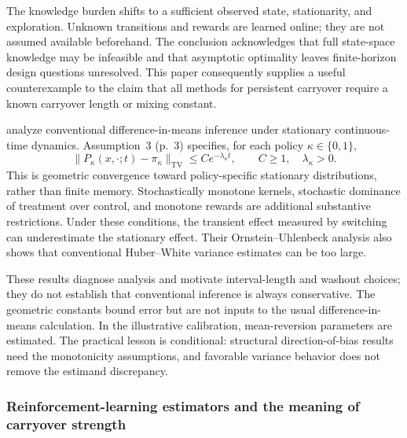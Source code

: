 The knowledge burden shifts to a sufficient observed state, stationarity, and exploration. Unknown transitions and rewards are learned online; they are not assumed available beforehand. The conclusion acknowledges that full state-space knowledge may be infeasible and that asymptotic optimality leaves finite-horizon design questions unresolved. This paper consequently supplies a useful counterexample to the claim that all methods for persistent carryover require a known carryover length or mixing constant.

\citet{blanchet2026} analyze conventional difference-in-means inference under stationary continuous-time dynamics. Assumption~3 (p.~3) specifies, for each policy $\kappa\in\{0,1\}$,
\begin{equation}
 \lVert P_\kappa(x,\cdot;t)-\pi_\kappa\rVert_{\mathrm{TV}}
 \leq C e^{-\lambda_\kappa t},
 \qquad C\geq1,\quad \lambda_\kappa>0.
\end{equation}
This is geometric convergence toward policy-specific stationary distributions, rather than finite memory. Stochastically monotone kernels, stochastic dominance of treatment over control, and monotone rewards are additional substantive restrictions. Under these conditions, the transient effect measured by switching can underestimate the stationary effect. Their Ornstein--Uhlenbeck analysis also shows that conventional Huber--White variance estimates can be too large.

These results diagnose analysis and motivate interval-length and washout choices; they do not establish that conventional inference is always conservative. The geometric constants bound error but are not inputs to the usual difference-in-means calculation. In the illustrative calibration, mean-reversion parameters are estimated. The practical lesson is conditional: structural direction-of-bias results need the monotonicity assumptions, and favorable variance behavior does not remove the estimand discrepancy.

\subsubsection{Reinforcement-learning estimators and the meaning of carryover strength}

